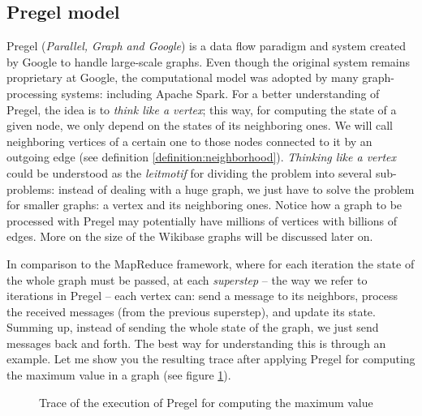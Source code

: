 \subsection{Pregel model}
\label{section:pregel}

Pregel (\textit{Parallel, Graph and Google}) is a data flow paradigm and system created by Google to handle large-scale graphs. Even though the original system remains proprietary at Google, the computational model was adopted by many graph-processing systems: including Apache Spark. For a better understanding of Pregel, the idea is to \textit{think like a vertex}; this way, for computing the state of a given node, we only depend on the states of its neighboring ones. We will call neighboring vertices of a certain one to those nodes connected to it by an outgoing edge (see definition \ref{definition:neighborhood}). \textit{Thinking like a vertex} could be understood as the \textit{leitmotif} for dividing the problem into several sub-problems: instead of dealing with a huge graph, we just have to solve the problem for smaller graphs: a vertex and its neighboring ones. Notice how a graph to be processed with Pregel may potentially have millions of vertices with billions of edges. More on the size of the Wikibase graphs will be discussed later on.

In comparison to the MapReduce framework, where for each iteration the state of the whole graph must be passed, at each \textit{superstep} -- the way we refer to iterations in Pregel -- each vertex can: send a message to its neighbors, process the received messages (from the previous superstep), and update its state. Summing up, instead of sending the whole state of the graph, we just send messages back and forth. The best way for understanding this is through an example. Let me show you the resulting trace after applying Pregel for computing the maximum value in a graph (see figure \ref{fig:pregel}).

\begin{figure}[ht]
    \centering
    
    \caption[Trace of the execution of Pregel for computing the maximum value]{Trace of the execution of Pregel for computing the maximum value~\cite{10.1145/1807167.1807184}}
    \label{fig:pregel}
\end{figure}

